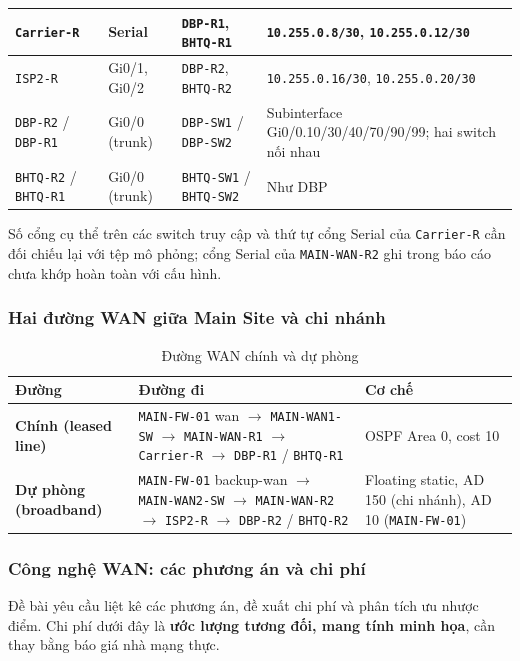 \begin{small}
\begin{longtable}{|p{3.0cm}|p{2.2cm}|p{3.6cm}|p{4.8cm}|}
\texttt{Carrier-R} & Serial & \texttt{DBP-R1}, \texttt{BHTQ-R1} & \texttt{10.255.0.8/30}, \texttt{10.255.0.12/30} \\ \hline
\texttt{ISP2-R} & Gi0/1, Gi0/2 & \texttt{DBP-R2}, \texttt{BHTQ-R2} & \texttt{10.255.0.16/30}, \texttt{10.255.0.20/30} \\ \hline
\texttt{DBP-R2} / \texttt{DBP-R1} & Gi0/0 (trunk) & \texttt{DBP-SW1} / \texttt{DBP-SW2} & Subinterface Gi0/0.10/30/40/70/90/99; hai switch nối nhau \\ \hline
\texttt{BHTQ-R2} / \texttt{BHTQ-R1} & Gi0/0 (trunk) & \texttt{BHTQ-SW1} / \texttt{BHTQ-SW2} & Như DBP \\ \hline
\end{longtable}
\end{small}
\noindent Số cổng cụ thể trên các switch truy cập và thứ tự cổng Serial của \texttt{Carrier-R} cần đối chiếu lại với tệp mô phỏng; cổng Serial của \texttt{MAIN-WAN-R2} ghi trong báo cáo chưa khớp hoàn toàn với cấu hình.

\subsubsection{Hai đường WAN giữa Main Site và chi nhánh}
\begin{small}
\setlength{\tabcolsep}{4pt}
\begin{longtable}{|p{2.8cm}|p{6.6cm}|p{4.4cm}|}
\caption{Đường WAN chính và dự phòng} \label{tab:wan_paths} \\
\hline
\textbf{Đường} & \textbf{Đường đi} & \textbf{Cơ chế} \\ \hline
\endhead
\textbf{Chính (leased line)} & \texttt{MAIN-FW-01} wan $\to$ \texttt{MAIN-WAN1-SW} $\to$ \texttt{MAIN-WAN-R1} $\to$ \texttt{Carrier-R} $\to$ \texttt{DBP-R1} / \texttt{BHTQ-R1} & OSPF Area 0, cost 10 \\ \hline
\textbf{Dự phòng (broadband)} & \texttt{MAIN-FW-01} backup-wan $\to$ \texttt{MAIN-WAN2-SW} $\to$ \texttt{MAIN-WAN-R2} $\to$ \texttt{ISP2-R} $\to$ \texttt{DBP-R2} / \texttt{BHTQ-R2} & Floating static, AD 150 (chi nhánh), AD 10 (\texttt{MAIN-FW-01}) \\ \hline
\end{longtable}
\end{small}

\subsubsection{Công nghệ WAN: các phương án và chi phí}
Đề bài yêu cầu liệt kê các phương án, đề xuất chi phí và phân tích ưu nhược điểm. Chi phí dưới đây là \textbf{ước lượng tương đối, mang tính minh họa}, cần thay bằng báo giá nhà mạng thực.

